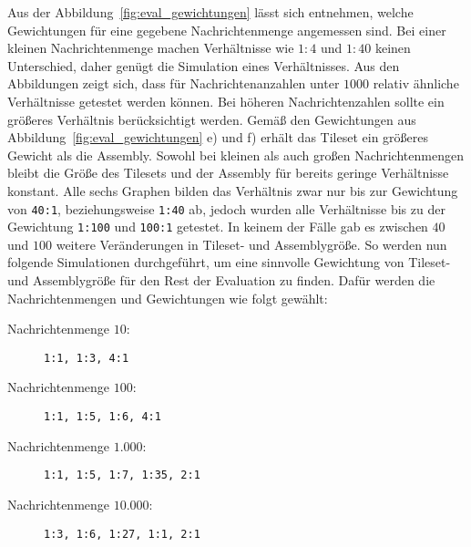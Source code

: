 Aus der Abbildung~\ref{fig:eval_gewichtungen} lässt sich entnehmen, welche Gewichtungen für eine gegebene Nachrichtenmenge angemessen sind. Bei einer kleinen Nachrichtenmenge machen Verhältnisse wie $1:4$ und $1:40$ keinen Unterschied, daher genügt die Simulation eines Verhältnisses. Aus den Abbildungen zeigt sich, dass für Nachrichtenanzahlen unter $1000$ relativ ähnliche Verhältnisse getestet werden können. Bei höheren Nachrichtenzahlen sollte ein größeres Verhältnis berücksichtigt werden. Gemäß den Gewichtungen aus Abbildung~\ref{fig:eval_gewichtungen} e) und f) erhält das Tileset ein größeres Gewicht als die Assembly. Sowohl bei kleinen als auch großen Nachrichtenmengen bleibt die Größe des Tilesets und der Assembly für bereits geringe Verhältnisse konstant. Alle sechs Graphen bilden das Verhältnis zwar nur bis zur Gewichtung von \texttt{40:1}, beziehungsweise \texttt{1:40} ab, jedoch wurden alle Verhältnisse bis zu der Gewichtung \texttt{1:100} und \texttt{100:1} getestet. In keinem der Fälle gab es zwischen $40$ und $100$ weitere Veränderungen in Tileset- und Assemblygröße. So werden nun folgende Simulationen durchgeführt, um eine sinnvolle Gewichtung von Tileset- und Assemblygröße für den Rest der Evaluation zu finden. Dafür werden die Nachrichtenmengen und Gewichtungen wie folgt gewählt:
\begin{description}
    \item[Nachrichtenmenge $10$:] \texttt{1:1, 1:3, 4:1}
    \item[Nachrichtenmenge $100$:] \texttt{1:1, 1:5, 1:6, 4:1}
    \item[Nachrichtenmenge $1.000$:] \texttt{1:1, 1:5, 1:7, 1:35, 2:1}
    \item[Nachrichtenmenge $10.000$:] \texttt{1:3, 1:6, 1:27, 1:1, 2:1}
\end{description}


